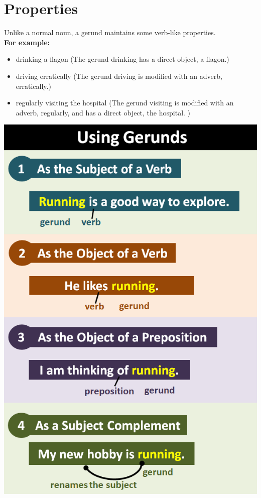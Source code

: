 \chapter{Properties}
Unlike a normal noun, a gerund maintains some verb-like properties.\\
\textbf{For example:} 
\begin{itemize}
    \item drinking a flagon (The gerund drinking has a direct object, a flagon.)
    \item driving erratically (The gerund driving is modified with an adverb, erratically.)
    \item regularly visiting the hospital (The gerund visiting is modified with an adverb, regularly, and has a direct object, the hospital. )
\end{itemize}
\begin{center}
    \includegraphics[scale=0.45]{project-folders/Gerunds/gerunds_use.png}
\end{center}


